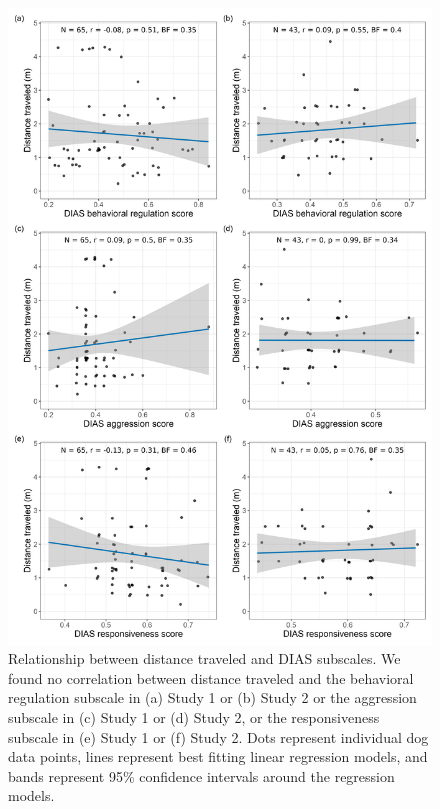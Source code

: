 \documentclass[
  doc]{apa6}
\begin{document}
\begin{figure}

{\centering \includegraphics[width=0.75\linewidth]{figures/distance_dias_subscales} 

}

\caption{Relationship between distance traveled and DIAS subscales. We found no correlation between distance traveled and the behavioral regulation subscale in (a) Study 1 or (b) Study 2 or the aggression subscale in (c) Study 1 or (d) Study 2, or the responsiveness subscale in (e) Study 1 or (f) Study 2. Dots represent individual dog data points, lines represent best fitting linear regression models, and bands represent 95\% confidence intervals around the regression models. }\label{fig:dias-all}
\end{figure}
\end{document}
